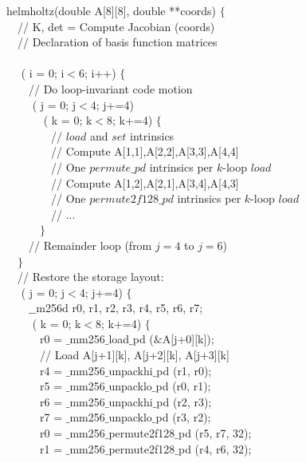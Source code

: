 \documentclass[conference]{IEEEtran}
\begin{document}
\begin{algorithm}[t]
\small
{} helmholtz(double A[8][8], double **coords) $\lbrace$\\
~~// K, det = Compute Jacobian (coords) \\
~~// Declaration of basis function matrices \\
~~\\
~~ ( i = 0; i$<$6; i++) $\lbrace$ \\
~~~~// Do loop-invariant code motion \\
~~~~ ( j = 0; j$<$4; j+=4) \\
~~~~~~ ( k = 0; k$<$8; k+=4) $\lbrace$\\
~~~~~~~~// $load$ and $set$ intrinsics \\
~~~~~~~~// Compute A[1,1],A[2,2],A[3,3],A[4,4] \\
~~~~~~~~// One $permute\_pd$ intrinsics per $k$-loop $load$\\
~~~~~~~~// Compute A[1,2],A[2,1],A[3,4],A[4,3] \\
~~~~~~~~// One $permute2f128\_pd$ intrinsics per $k$-loop $load$\\
~~~~~~~~// ...\\
~~~~~~$\rbrace$\\
~~~~// Remainder loop (from $j=4$ to $j=6$)\\
~~$\rbrace$\\
~~// Restore the storage layout:\\
~~ ( j = 0; j$<$4; j+=4) $\lbrace$\\
~~~~$\_\_$m256d r0, r1, r2, r3, r4, r5, r6, r7;\\
~~~~ ( k = 0; k$<$8; k+=4) $\lbrace$\\
~~~~~~r0 = $\_$mm256$\_$load$\_$pd ($\&$A[j+0][k]);\\
~~~~~~// Load A[j+1][k], A[j+2][k], A[j+3][k]\\
~~~~~~r4 = $\_$mm256$\_$unpackhi$\_$pd (r1, r0);\\
~~~~~~r5 = $\_$mm256$\_$unpacklo$\_$pd (r0, r1);\\
~~~~~~r6 = $\_$mm256$\_$unpackhi$\_$pd (r2, r3);\\
~~~~~~r7 = $\_$mm256$\_$unpacklo$\_$pd (r3, r2);\\
~~~~~~r0 = $\_$mm256$\_$permute2f128$\_$pd (r5, r7, 32);\\
~~~~~~r1 = $\_$mm256$\_$permute2f128$\_$pd (r4, r6, 32);\\

\end{algorithm}
\end{document}
